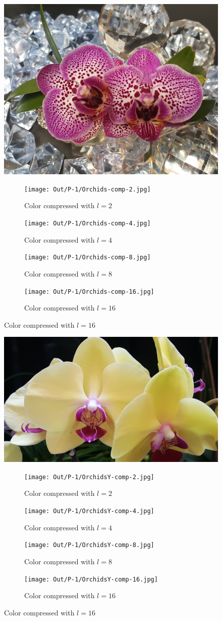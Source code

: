 \documentclass[dvipsnames]{article}
\begin{document}
\begin{figure}[H]
	\centering\includegraphics[width=.5\linewidth]{Images/P-1/Orchids.jpg}
	\caption{Original Orchids.jpg}

	\begin{subfigure}{.33\linewidth}
		\centering\texttt{[image: Out/P-1/Orchids-comp-2.jpg]}
		\caption{Color compressed with $l = 2$}
	\end{subfigure}
	\begin{subfigure}{.33\linewidth}
		\centering\texttt{[image: Out/P-1/Orchids-comp-4.jpg]}
		\caption{Color compressed with $l = 4$}
	\end{subfigure}
	\begin{subfigure}{.33\linewidth}
		\centering\texttt{[image: Out/P-1/Orchids-comp-8.jpg]}
		\caption{Color compressed with $l = 8$}
	\end{subfigure}
	\begin{subfigure}{.33\linewidth}
		\centering\texttt{[image: Out/P-1/Orchids-comp-16.jpg]}
		\caption{Color compressed with $l = 16$}
	\end{subfigure}
\end{figure}

\begin{figure}[H]
	\centering\includegraphics[width=.5\linewidth]{Images/P-1/OrchidsY.jpg}
	\caption{Original OrchidsY.jpg}

	\begin{subfigure}{.33\linewidth}
		\centering\texttt{[image: Out/P-1/OrchidsY-comp-2.jpg]}
		\caption{Color compressed with $l = 2$}
	\end{subfigure}
	\begin{subfigure}{.33\linewidth}
		\centering\texttt{[image: Out/P-1/OrchidsY-comp-4.jpg]}
		\caption{Color compressed with $l = 4$}
	\end{subfigure}
	\begin{subfigure}{.33\linewidth}
		\centering\texttt{[image: Out/P-1/OrchidsY-comp-8.jpg]}
		\caption{Color compressed with $l = 8$}
	\end{subfigure}
	\begin{subfigure}{.33\linewidth}
		\centering\texttt{[image: Out/P-1/OrchidsY-comp-16.jpg]}
		\caption{Color compressed with $l = 16$}
	\end{subfigure}
\end{figure}
\end{document}
